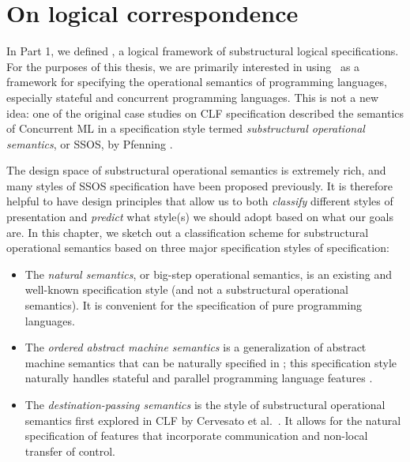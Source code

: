 \chapter{On logical correspondence}
\label{chapter-correspondence}

In Part 1, we defined \sls, a logical framework of substructural
logical specifications. For the purposes of this thesis, we are
primarily interested in using \sls~as a framework for specifying the
operational semantics of programming languages, especially stateful
and concurrent programming languages. This is not a new idea: one of
the original case studies on CLF specification described the semantics
of Concurrent ML \cite{cervesato02concurrent} in a specification style
termed {\it substructural operational semantics}, or SSOS, by Pfenning
\cite{pfenning04substructural}. 

The design space of substructural operational semantics is extremely
rich, and many styles of SSOS specification have been proposed
previously. It is therefore helpful to have design principles that
allow us to both {\it classify} different styles of presentation and
{\it predict} what style(s) we should adopt based on what our goals
are. In this chapter, we sketch out a classification scheme for
substructural operational semantics based on three major specification
styles of specification:

\begin{itemize}
\item The {\it natural semantics}, or big-step operational semantics,
  is an existing and well-known specification style (and not a
  substructural operational semantics). It is convenient for the
  specification of pure programming languages.

\item The {\it ordered abstract machine semantics} is a generalization
  of abstract machine semantics that can be naturally specified in
  \sls; this specification style naturally handles stateful and
  parallel programming language features
  \cite{pfenning09substructural}.

\item The {\it destination-passing semantics} is the style of
  substructural operational semantics first explored in CLF by
  Cervesato et al.~\cite{cervesato02concurrent}. It allows for the
  natural specification of features that incorporate 
  communication and non-local transfer of control. %
\end{itemize}




